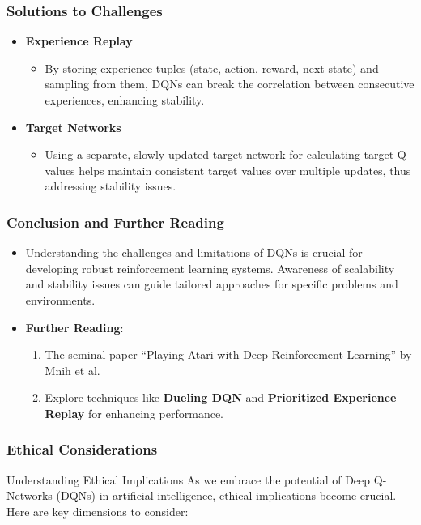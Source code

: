 \documentclass[aspectratio=169]{beamer}
\begin{document}
\begin{frame}[fragile]
    \frametitle{Solutions to Challenges}
    \begin{itemize}
        \item \textbf{Experience Replay}
            \begin{itemize}
                \item By storing experience tuples (state, action, reward, next state) and sampling from them, DQNs can break the correlation between consecutive experiences, enhancing stability.
            \end{itemize}

        \item \textbf{Target Networks}
            \begin{itemize}
                \item Using a separate, slowly updated target network for calculating target Q-values helps maintain consistent target values over multiple updates, thus addressing stability issues.
            \end{itemize}
    \end{itemize}
\end{frame}

\begin{frame}[fragile]
    \frametitle{Conclusion and Further Reading}
    \begin{itemize}
        \item Understanding the challenges and limitations of DQNs is crucial for developing robust reinforcement learning systems. Awareness of scalability and stability issues can guide tailored approaches for specific problems and environments.
        
        \item \textbf{Further Reading}:
            \begin{enumerate}
                \item The seminal paper ``Playing Atari with Deep Reinforcement Learning'' by Mnih et al.
                \item Explore techniques like \textbf{Dueling DQN} and \textbf{Prioritized Experience Replay} for enhancing performance.
            \end{enumerate}
    \end{itemize}
\end{frame}

\begin{frame}[fragile]
    \frametitle{Ethical Considerations}
    \begin{block}{Understanding Ethical Implications}
        As we embrace the potential of Deep Q-Networks (DQNs) in artificial intelligence, 
        ethical implications become crucial. Here are key dimensions to consider:
    \end{block}
\end{frame}
\end{document}
